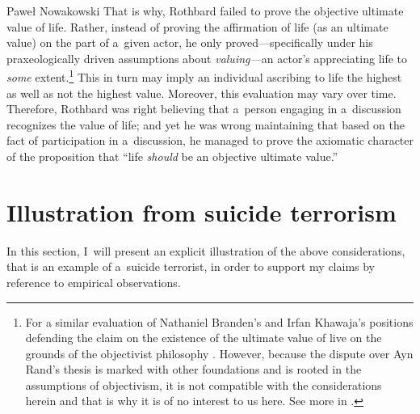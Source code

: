 \begin{artengenv}{Paweł Nowakowski}
That is why, Rothbard failed to prove the objective ultimate value of life. Rather, instead of proving the affirmation of life (as an ultimate value) on the part of a~given actor, he only proved---specifically under his praxeologically driven assumptions about \textit{valuing---}an actor's appreciating life to \textit{some} extent.\footnote{For a similar evaluation of Nathaniel Branden’s and Irfan Khawaja’s positions defending the claim on the existence of the ultimate value of live on the grounds of the objectivist philosophy
\parencite[see][pp.97–98]{Moen2012Is}. %
However, because the dispute over Ayn Rand’s thesis is marked with other foundations and is rooted in the assumptions of objectivism, it is not compatible with the considerations herein and that is why it is of no interest to us here. See more in
\parencites[][]{Nozick1971On}[][pp.69–86]{Rasmussen2002Rand}[][pp.54–67]{Hartford2017Ultimate}.%
%
} This in turn may imply an individual ascribing to life the highest as well as not the highest value. Moreover, this evaluation may vary over time. Therefore, Rothbard was right believing that a~person engaging in a~discussion recognizes the value of life; and yet he was wrong maintaining that based on the fact of participation in a~discussion, he managed to prove the axiomatic character of the proposition that ``life \textit{should} be an objective ultimate value.''



\section{Illustration from suicide terrorism}

In this section, I~will present an explicit illustration of the above considerations, that is an example of a~suicide terrorist, in order to support my claims by reference to empirical observations.




\end{artengenv}
